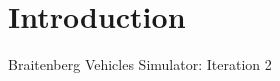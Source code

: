 \hypertarget{index_intro_sec}{}\section{Introduction}\label{index_intro_sec}
Braitenberg Vehicles Simulator\+: Iteration 2 